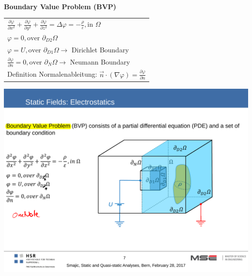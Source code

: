 \textbf{\\ Boundary Value Problem (BVP)\\}
\begin{minipage}[lt]{11cm}
	\begin{tabular}{l}
		\(\displaystyle \frac{\partial \varphi}{\partial x^2} + \frac{\partial \varphi}{\partial y^2} +\frac{\partial \varphi}{\partial z^2} = \Delta \varphi = - \frac{\rho}{\varepsilon}, \text{in } \Omega\) \\
		\(\displaystyle \varphi = 0, \text{over } \partial_{D2} \Omega \) \\
		\(\displaystyle \varphi = U, \text{over } \partial_{D1} \Omega \rightarrow \) Dirichlet Boundary \\
		\(\displaystyle \frac{\partial \varphi}{\partial n} = 0, \text{over } \partial_{N} \Omega \rightarrow \) Neumann Boundary \\	
		Definition Normalenableitung: \(\displaystyle \vec{n} \cdot \left(\nabla \varphi\right) = \frac{\partial \varphi}{\partial n}\)	
	\end{tabular}
\end{minipage}
\begin{minipage}[rt]{8cm}
	\includegraphics[width=.8\textwidth]{./images/BVP_electrostatic.pdf}
\end{minipage}